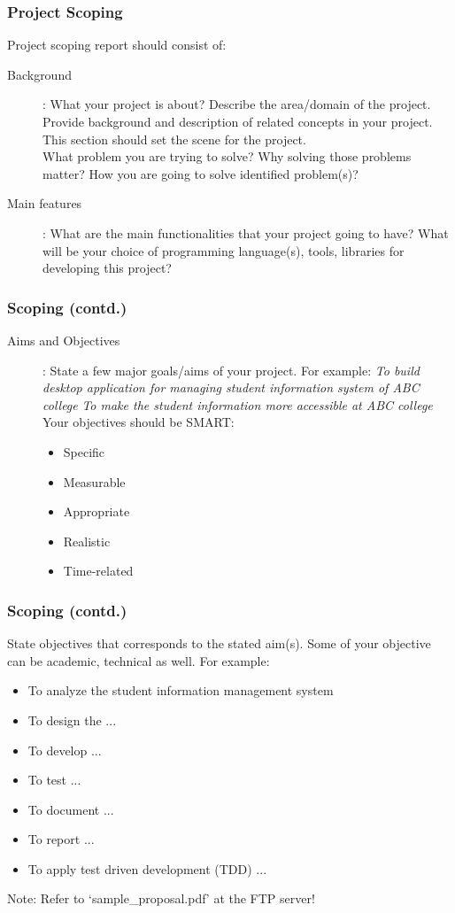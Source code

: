 \documentclass{beamer}
\begin{document}
\begin{frame}[t]\frametitle{Project Scoping}
Project scoping report should consist of:
\begin{description}
    \item[Background]: What your project is about? Describe the area/domain of the project. Provide background and description of related concepts in your project. This section should set the scene for the project. \\

    What problem you are trying to solve? Why solving those problems matter? How you are going to solve identified problem(s)?

    \item[Main features]:
    What are the main functionalities that your project going to have? What will be your choice of programming language(s), tools, libraries for developing this project?
\end{description}
\end{frame}

\begin{frame}[t]\frametitle{Scoping (contd.)}
    \begin{description}
        \item[Aims and Objectives]:
    State a few major goals/aims of your project. For example:
    \emph{To build desktop application for managing student information system of ABC college}
    \emph{To make the student information more accessible at ABC college}\\

    Your objectives should be SMART:
    \begin{itemize}
        \item Specific
        \item Measurable
        \item Appropriate
        \item Realistic
        \item Time-related
    \end{itemize}
    \end{description}
\end{frame}

\begin{frame}[t]\frametitle{Scoping (contd.)}
    State objectives that corresponds to the stated aim(s).  Some of your objective can be academic, technical as well. For example:
    \begin{itemize}
        \item To analyze the student information management system
        \item To design the ...
        \item To develop ...
        \item To test ...
        \item To document ...
        \item To report ...
        \item To apply test driven development (TDD) ...
    \end{itemize}
Note: Refer to `sample\_proposal.pdf' at the FTP server!
\end{frame}
\end{document}
